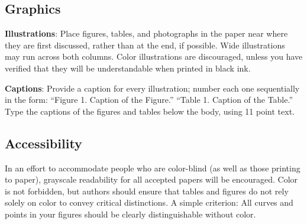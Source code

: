 \subsection{Graphics}

{\bf Illustrations}: Place figures, tables, and photographs in the
paper near where they are first discussed, rather than at the end, if
possible.  Wide illustrations may run across both columns.  Color
illustrations are discouraged, unless you have verified that  
they will be understandable when printed in black ink.

{\bf Captions}: Provide a caption for every illustration; number each one
sequentially in the form:  ``Figure 1. Caption of the Figure.'' ``Table 1.
Caption of the Table.''  Type the captions of the figures and 
tables below the body, using 11 point text.


\subsection{Accessibility}
\label{ssec:accessibility}

In an effort to accommodate people who are color-blind (as well as those printing
to paper), grayscale readability for all accepted papers will be
encouraged.  Color is not forbidden, but authors should ensure that
tables and figures do not rely solely on color to convey critical
distinctions. A simple criterion: All curves and points in your figures should be clearly distinguishable without color.





